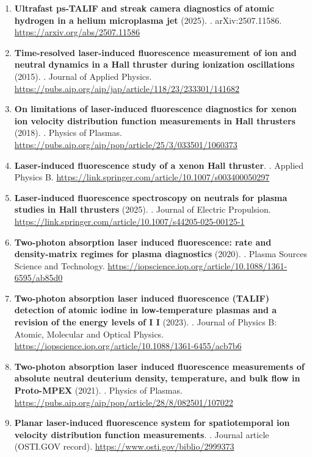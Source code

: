 \documentclass[11pt,a4paper]{article}
\begin{document}
\begin{enumerate}[leftmargin=1.4em]
\item \textbf{Ultrafast ps-TALIF and streak camera diagnostics of atomic hydrogen in a helium microplasma jet} (2025). . arXiv:2507.11586. \url{https://arxiv.org/abs/2507.11586}
\item \textbf{Time-resolved laser-induced fluorescence measurement of ion and neutral dynamics in a Hall thruster during ionization oscillations} (2015). . Journal of Applied Physics. \url{https://pubs.aip.org/aip/jap/article/118/23/233301/141682}
\item \textbf{On limitations of laser-induced fluorescence diagnostics for xenon ion velocity distribution function measurements in Hall thrusters} (2018). . Physics of Plasmas. \url{https://pubs.aip.org/aip/pop/article/25/3/033501/1060373}
\item \textbf{Laser-induced fluorescence study of a xenon Hall thruster}. . Applied Physics B. \url{https://link.springer.com/article/10.1007/s003400050297}
\item \textbf{Laser-induced fluorescence spectroscopy on neutrals for plasma studies in Hall thrusters} (2025). . Journal of Electric Propulsion. \url{https://link.springer.com/article/10.1007/s44205-025-00125-1}
\item \textbf{Two-photon absorption laser induced fluorescence: rate and density-matrix regimes for plasma diagnostics} (2020). . Plasma Sources Science and Technology. \url{https://iopscience.iop.org/article/10.1088/1361-6595/ab85d0}
\item \textbf{Two-photon absorption laser induced fluorescence (TALIF) detection of atomic iodine in low-temperature plasmas and a revision of the energy levels of I I} (2023). . Journal of Physics B: Atomic, Molecular and Optical Physics. \url{https://iopscience.iop.org/article/10.1088/1361-6455/acb7b6}
\item \textbf{Two-photon absorption laser induced fluorescence measurements of absolute neutral deuterium density, temperature, and bulk flow in Proto-MPEX} (2021). . Physics of Plasmas. \url{https://pubs.aip.org/aip/pop/article/28/8/082501/107022}
\item \textbf{Planar laser-induced fluorescence system for spatiotemporal ion velocity distribution function measurements}. . Journal article (OSTI.GOV record). \url{https://www.osti.gov/biblio/2999373}
\end{enumerate}
\end{document}
